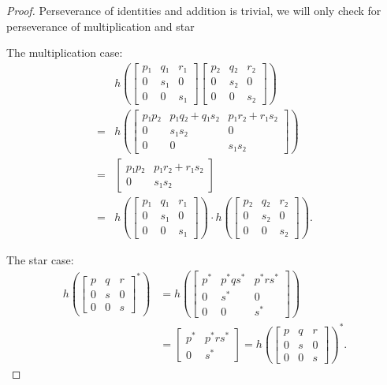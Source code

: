 \begin{proof}
  Perseverance of identities and addition is trivial,
  we will only check for perseverance of multiplication and star

  The multiplication case:
  \begin{align*}
    & h(\begin{bmatrix}
      p₁ & q₁ & r₁ \\
      0 & s₁ & 0 \\  
      0 & 0 & s₁
    \end{bmatrix}
    \begin{bmatrix}
      p₂ & q₂ & r₂ \\
      0 & s₂ & 0 \\  
      0 & 0 & s₂
    \end{bmatrix}) \\
    ={} & h(\begin{bmatrix}
      p₁ p₂ & p₁q₂ + q₁s₂ & p₁ r₂ + r₁ s₂ \\
      0 & s₁ s₂ & 0 \\  
      0 & 0 & s₁ s₂
    \end{bmatrix}) \\
    = {}& \begin{bmatrix}
      p₁ p₂& p₁ r₂ + r₁ s₂ \\
      0 & s₁ s₂ 
    \end{bmatrix} \\
    = {}& h(\begin{bmatrix}
      p₁ & q₁ & r₁ \\
      0 & s₁ & 0 \\  
      0 & 0 & s₁
    \end{bmatrix}) ⋅
    h(\begin{bmatrix}
      p₂ & q₂ & r₂ \\
      0 & s₂ & 0 \\  
      0 & 0 & s₂
    \end{bmatrix}).
  \end{align*}

  The star case:
  \begin{align*}
    h(\begin{bmatrix}
      p & q & r \\
      0 & s & 0 \\  
      0 & 0 & s
    \end{bmatrix}^*)
    & = 
    h(\begin{bmatrix}
      p^*  & p^*  q s^* & p^*  r s^* \\
      0 & s^* & 0 \\  
      0 & 0 & s^*
    \end{bmatrix})\\
    & = \begin{bmatrix}
      p^* & p^*  r s^* \\
      0 & s^* 
    \end{bmatrix}
    = h(\begin{bmatrix}
      p & q & r \\
      0 & s & 0 \\  
      0 & 0 & s
    \end{bmatrix})^*.
  \end{align*}
\end{proof}


